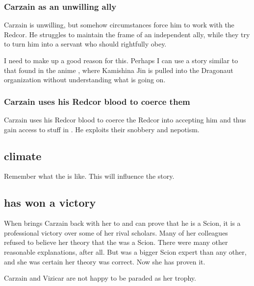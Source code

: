\subsubsection{Carzain as an unwilling ally}
Carzain is unwilling, but somehow circumstances force him to work with the Redcor. 
He struggles to maintain the frame of an independent ally, while they try to turn him into a servant who should rightfully obey. 

I need to make up a good reason for this. 
Perhaps I can use a story similar to that found in the anime \cite{Anime:Dragonaut}, where Kamishina Jin is pulled into the Dragonaut organization without understanding what is going on. 





\subsubsection{Carzain uses his Redcor blood to coerce them}
Carzain uses his Redcor blood to coerce the Redcor into accepting him and thus gain access to stuff in \Redce. 
He exploits their snobbery and nepotism.










\subsection{\Redcean{} climate}
Remember what the  is like. 
This will influence the story. 









\subsection{\Esmerel{} has won a victory}
When \Esmerel{} brings Carzain back with her to \Redce{} and can prove that he is a Scion, it is a professional victory over some of her rival scholars.
Many of her colleagues refused to believe her theory that the \spike{} was a Scion. 
There were many other reasonable explanations, after all. 
But \Esmerel{} was a bigger Scion expert than any other, and she was certain her theory was correct. 
Now she has proven it. 

Carzain and Vizicar are not happy to be paraded as her trophy. 









